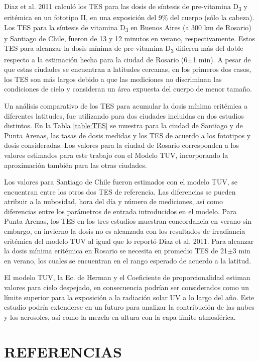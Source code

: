 \documentclass[10pt,twocolumn]{article}
\begin{document}
Diaz et al. 2011 calculó los TES para las dosis de síntesis de pre-vitamina D\textsubscript{3} y eritémica en un fototipo II, en una exposición del 9\% del cuerpo (sólo la cabeza). Los TES para la síntesis de vitamina D\textsubscript{3} en Buenos Aires (a 300 km de Rosario) y Santiago de Chile, fueron de 13 y 12 minutos en verano, respectivamente.\cite{IPINA2012966} Estos TES para alcanzar la dosis mínima de pre-vitamina D\textsubscript{3} difieren más del doble respecto a la estimación hecha para la ciudad de Rosario (6±1 min). A pesar de que estas ciudades se encuentran a latitudes cercanas, en los primeros dos casos, los TES son más largos debido a que las mediciones no discriminan las condiciones de cielo y consideran un área expuesta del cuerpo de menor tamaño.

Un análisis comparativo de los TES para acumular la dosis mínima eritémica a diferentes latitudes, fue utilizando para dos ciudades incluidas en dos estudios distintos.\cite{Diaz2011,cabrera_radiacion_2005}  En la Tabla \ref{table:TES} se muestra para la ciudad de Santiago y de Punta Arenas, las tasas de dosis medidas y los TES de acuerdo a los fototipos y dosis consideradas. Los valores para la ciudad de Rosario corresponden a los valores estimados para este trabajo con el Modelo TUV, incorporando la aproximación también para las otras ciudades.

Los valores para Santiago de Chile fueron estimados con el modelo TUV, se encuentran entre los otros dos TES de referencia. Las diferencias se pueden atribuir a la nubosidad, hora del día y número de mediciones, así como diferencias entre los parámetros de entrada introducidos en el modelo. Para Punta Arenas, los TES en los tres estudios muestran concordancia en verano sin embargo, en invierno la dosis no es alcanzada con los resultados de irradiancia eritémica del modelo TUV al igual que lo reportó Diaz et al. 2011. Para alcanzar la dosis mínima eritémica en Rosario se necesita en promedio TES de 21$\pm$3 min en verano, los cuales se encuentran en el rango esperado de acuerdo a la latitud.

El modelo TUV, la Ec. de Herman y el Coeficiente de proporcionalidad estiman valores para cielo despejado, en consecuencia podrían ser considerados como un límite superior para la exposición a la radiación solar UV a lo largo del año. Este estudio podría extenderse en un futuro para analizar la contribución de las nubes y los aerosoles,\cite{Kim2020} así como la mezcla en altura con la capa límite atmosférica.
\section{REFERENCIAS}
\renewcommand{\refname}{}

\end{document}
